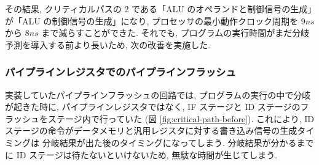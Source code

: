 \documentclass[../improvements.tex]{subfiles}
\begin{document}
  その結果, クリティカルパスの 2 である「ALU のオペランドと制御信号の生成」が「ALU の制御信号の生成」になり, 
  プロセッサの最小動作クロック周期を $9ns$ から $8ns$ まで減らすことができた.
  それでも, プログラムの実行時間がまだ分岐予測を導入する前より長いため, 次の改善を実施した.

  \subsubsection{パイプラインレジスタでのパイプラインフラッシュ} \label{subsubsection:rethink-flush}
  実装していたパイプラインフラッシュの回路では, 
  プログラムの実行の中で分岐が起きた時に, 
  パイプラインレジスタではなく, IF ステージと ID ステージのフラッシュをステージ内で行っていた (図 \ref{fig:critical-path-before}).
  これにより, ID ステージの命令がデータメモリと汎用レジスタに対する書き込み信号の生成タイミングは
  分岐結果が出た後のタイミングになってしまう.
  分岐結果が分かるまでに ID ステージは待たないといけないため, 無駄な時間が生じてしまう.
\end{document}
